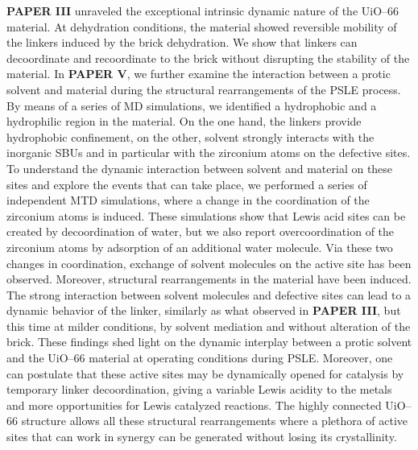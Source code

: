 \textbf{PAPER III} unraveled the exceptional intrinsic dynamic nature of the UiO--66 material. At dehydration conditions, the material showed reversible mobility of the linkers induced by the brick dehydration. We show that linkers can decoordinate and recoordinate to the brick without disrupting the stability of the material. In \textbf{PAPER V}, we further examine the interaction between a protic solvent and material during the structural rearrangements of the PSLE process. By means of a series of MD simulations, we identified a hydrophobic and a hydrophilic region in the material. On the one hand, the linkers provide hydrophobic confinement, on the other, solvent strongly interacts with the inorganic SBUs and in particular with the zirconium atoms on the defective sites. To understand the dynamic interaction between solvent and material on these sites and explore the events that can take place, we performed a series of independent MTD simulations, where a change in the coordination of the zirconium atoms is induced. These simulations show that Lewis acid sites can be created by decoordination of water, but we also report overcoordination of the zirconium atoms by adsorption of an additional water molecule. Via these two changes in coordination, exchange of solvent molecules on the active site has been observed. Moreover, structural rearrangements in the material have been induced. The strong interaction between solvent molecules and defective sites can lead to a dynamic behavior of the linker, similarly as what observed in \textbf{PAPER III}, but this time at milder conditions, by solvent mediation and without alteration of the brick. These findings shed light on the dynamic interplay between a protic solvent and the UiO--66 material at operating conditions during PSLE. Moreover, one can postulate that these active sites may be dynamically opened for catalysis by temporary linker decoordination, giving a variable Lewis acidity to the metals and more opportunities for Lewis catalyzed reactions. The highly connected UiO--66 structure allows all these structural rearrangements where a plethora of active sites that can work in synergy can be generated without losing its crystallinity.
\npar
